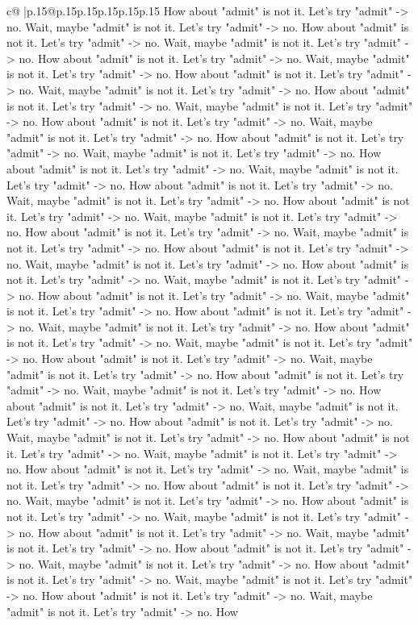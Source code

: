 \documentclass{article}
\begin{document}
{\begin{supertabular}{c@{$\;$}|p{.15\linewidth}@{}p{.15\linewidth}p{.15\linewidth}p{.15\linewidth}p{.15\linewidth}p{.15\linewidth}}
{{{How about "admit" is not it. Let's try "admit" {-}> no. Wait, maybe "admit" is not it. Let's try "admit" {-}> no. How about "admit" is not it. Let's try "admit" {-}> no. Wait, maybe "admit" is not it. Let's try "admit" {-}> no. How about "admit" is not it. Let's try "admit" {-}> no. Wait, maybe "admit" is not it. Let's try "admit" {-}> no. How about "admit" is not it. Let's try "admit" {-}> no. Wait, maybe "admit" is not it. Let's try "admit" {-}> no. How about "admit" is not it. Let's try "admit" {-}> no. Wait, maybe "admit" is not it. Let's try "admit" {-}> no. How about "admit" is not it. Let's try "admit" {-}> no. Wait, maybe "admit" is not it. Let's try "admit" {-}> no. How about "admit" is not it. Let's try "admit" {-}> no. Wait, maybe "admit" is not it. Let's try "admit" {-}> no. How about "admit" is not it. Let's try "admit" {-}> no. Wait, maybe "admit" is not it. Let's try "admit" {-}> no. How about "admit" is not it. Let's try "admit" {-}> no. Wait, maybe "admit" is not it. Let's try "admit" {-}> no. How about "admit" is not it. Let's try "admit" {-}> no. Wait, maybe "admit" is not it. Let's try "admit" {-}> no. How about "admit" is not it. Let's try "admit" {-}> no. Wait, maybe "admit" is not it. Let's try "admit" {-}> no. How about "admit" is not it. Let's try "admit" {-}> no. Wait, maybe "admit" is not it. Let's try "admit" {-}> no. How about "admit" is not it. Let's try "admit" {-}> no. Wait, maybe "admit" is not it. Let's try "admit" {-}> no. How about "admit" is not it. Let's try "admit" {-}> no. Wait, maybe "admit" is not it. Let's try "admit" {-}> no. How about "admit" is not it. Let's try "admit" {-}> no. Wait, maybe "admit" is not it. Let's try "admit" {-}> no. How about "admit" is not it. Let's try "admit" {-}> no. Wait, maybe "admit" is not it. Let's try "admit" {-}> no. How about "admit" is not it. Let's try "admit" {-}> no. Wait, maybe "admit" is not it. Let's try "admit" {-}> no. How about "admit" is not it. Let's try "admit" {-}> no. Wait, maybe "admit" is not it. Let's try "admit" {-}> no. How about "admit" is not it. Let's try "admit" {-}> no. Wait, maybe "admit" is not it. Let's try "admit" {-}> no. How about "admit" is not it. Let's try "admit" {-}> no. Wait, maybe "admit" is not it. Let's try "admit" {-}> no. How about "admit" is not it. Let's try "admit" {-}> no. Wait, maybe "admit" is not it. Let's try "admit" {-}> no. How about "admit" is not it. Let's try "admit" {-}> no. Wait, maybe "admit" is not it. Let's try "admit" {-}> no. How about "admit" is not it. Let's try "admit" {-}> no. Wait, maybe "admit" is not it. Let's try "admit" {-}> no. How about "admit" is not it. Let's try "admit" {-}> no. Wait, maybe "admit" is not it. Let's try "admit" {-}> no. How about "admit" is not it. Let's try "admit" {-}> no. Wait, maybe "admit" is not it. Let's try "admit" {-}> no. How about "admit" is not it. Let's try "admit" {-}> no. Wait, maybe "admit" is not it. Let's try "admit" {-}> no. How about "admit" is not it. Let's try "admit" {-}> no. Wait, maybe "admit" is not it. Let's try "admit" {-}> no. How about "admit" is not it. Let's try "admit" {-}> no. Wait, maybe "admit" is not it. Let's try "admit" {-}> no. How }}}
\end{supertabular}}
\end{document}
